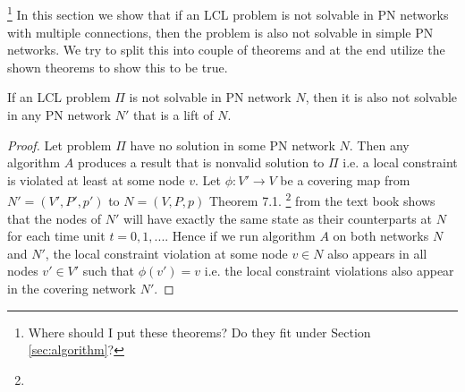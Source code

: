 
\subsection{}
\footnote{Where should I put these theorems? Do they fit under Section \ref{sec:algorithm}?}
In this section we show that if an LCL problem is not solvable in PN networks with multiple connections, then the problem is also not solvable in simple PN networks.
We try to split this into couple of theorems and at the end utilize the shown theorems to show this to be true.

\begin{theorem} \label{thm:lcl_nonsolvability:2}
If an LCL problem $\Pi$ is not solvable in PN network $N$, then it is also not solvable in any PN network $N'$ that is a lift of $N$.
\end{theorem}
\begin{proof}
    Let problem $\Pi$ have no solution in some PN network $N$.
    Then any algorithm $A$ produces a result that is nonvalid solution to $\Pi$ i.e. a local constraint is violated at least at some node $v$.
    Let $\phi: V' \rightarrow V$ be a covering map from $N'=(V', P', p')$ to $N=(V, P, p)$
    Theorem 7.1. \footnote{} from the text book \cite{HirvonenSuomelaDistAlg2020} shows that the nodes of $N'$ will have exactly the same state as their counterparts at $N$ for each time unit $t=0,1,...$.
    Hence if we run algorithm $A$ on both networks $N$ and $N'$, the local constraint violation at some node $v \in N$ also appears in all nodes $v' \in V'$ such that $\phi(v') = v$ i.e. the local constraint violations also appear in the covering network $N'$.
\end{proof}

